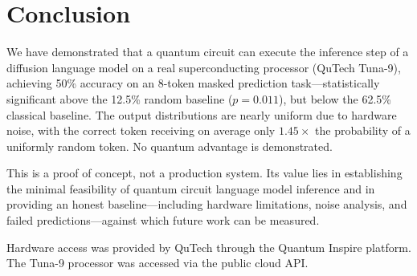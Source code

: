 \documentclass[prl,twocolumn,superscriptaddress,longbibliography,floatfix]{revtex4-2}
\begin{document}
\section{Conclusion}

We have demonstrated that a quantum circuit can execute the inference step of a diffusion language model on a real superconducting processor (QuTech Tuna-9), achieving 50\% accuracy on an 8-token masked prediction task---statistically significant above the 12.5\% random baseline ($p = 0.011$), but below the 62.5\% classical baseline. The output distributions are nearly uniform due to hardware noise, with the correct token receiving on average only $1.45\times$ the probability of a uniformly random token. No quantum advantage is demonstrated.

This is a proof of concept, not a production system. Its value lies in establishing the minimal feasibility of quantum circuit language model inference and in providing an honest baseline---including hardware limitations, noise analysis, and failed predictions---against which future work can be measured.

\begin{acknowledgments}
Hardware access was provided by QuTech through the Quantum Inspire platform. The Tuna-9 processor was accessed via the public cloud API.
\end{acknowledgments}
\end{document}
